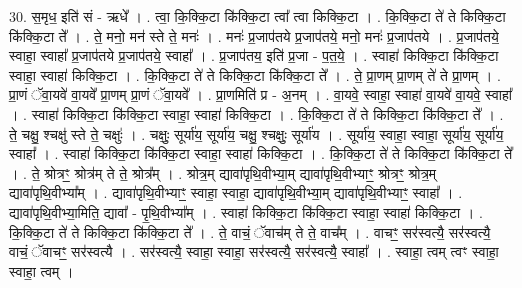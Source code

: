 \documentclass[17pt]{extarticle}
\begin{document}
30. स॒मृध॒ इति॑ सं - ऋधे᳚ । . त्वा॒ कि॒क्कि॒टा कि॑क्कि॒टा त्वा᳚ त्वा किक्कि॒टा । . कि॒क्कि॒टा ते॑ ते किक्कि॒टा कि॑क्कि॒टा ते᳚ । . ते॒ मनो॒ मन॑ स्ते ते॒ मनः॑ । . मनः॑ प्र॒जाप॑तये प्र॒जाप॑तये॒ मनो॒ मनः॑ प्र॒जाप॑तये । . प्र॒जाप॑तये॒ स्वाहा॒ स्वाहा᳚ प्र॒जाप॑तये प्र॒जाप॑तये॒ स्वाहा᳚ । . प्र॒जाप॑तय॒ इति॑ प्र॒जा - प॒त॒ये॒ । . स्वाहा॑ किक्कि॒टा कि॑क्कि॒टा स्वाहा॒ स्वाहा॑ किक्कि॒टा । . कि॒क्कि॒टा ते॑ ते किक्कि॒टा कि॑क्कि॒टा ते᳚ । . ते॒ प्रा॒णम् प्रा॒णम् ते॑ ते प्रा॒णम् । . प्रा॒णं ॅवा॒यवे॑ वा॒यवे᳚ प्रा॒णम् प्रा॒णं ॅवा॒यवे᳚ । . प्रा॒णमिति॑ प्र - अ॒नम् । . वा॒यवे॒ स्वाहा॒ स्वाहा॑ वा॒यवे॑ वा॒यवे॒ स्वाहा᳚ । . स्वाहा॑ किक्कि॒टा कि॑क्कि॒टा स्वाहा॒ स्वाहा॑ किक्कि॒टा । . कि॒क्कि॒टा ते॑ ते किक्कि॒टा कि॑क्कि॒टा ते᳚ । . ते॒ चक्षु॒ श्चक्षु॑ स्ते ते॒ चक्षुः॑ । . चक्षुः॒ सूर्या॑य॒ सूर्या॑य॒ चक्षु॒ श्चक्षुः॒ सूर्या॑य । . सूर्या॑य॒ स्वाहा॒ स्वाहा॒ सूर्या॑य॒ सूर्या॑य॒ स्वाहा᳚ । . स्वाहा॑ किक्कि॒टा कि॑क्कि॒टा स्वाहा॒ स्वाहा॑ किक्कि॒टा । . कि॒क्कि॒टा ते॑ ते किक्कि॒टा कि॑क्कि॒टा ते᳚ । . ते॒ श्रोत्रꣳ॒॒ श्रोत्र॑म् ते ते॒ श्रोत्र᳚म् । . श्रोत्र॒म् द्यावा॑पृथि॒वीभ्या॒म् द्यावा॑पृथि॒वीभ्याꣳ॒॒ श्रोत्रꣳ॒॒ श्रोत्र॒म् द्यावा॑पृथि॒वीभ्या᳚म् । . द्यावा॑पृथि॒वीभ्याꣳ॒॒ स्वाहा॒ स्वाहा॒ द्यावा॑पृथि॒वीभ्या॒म् द्यावा॑पृथि॒वीभ्याꣳ॒॒ स्वाहा᳚ । . द्यावा॑पृथि॒वीभ्या॒मिति॒ द्यावा᳚ - पृ॒थि॒वीभ्या᳚म् । . स्वाहा॑ किक्कि॒टा कि॑क्कि॒टा स्वाहा॒ स्वाहा॑ किक्कि॒टा । . कि॒क्कि॒टा ते॑ ते किक्कि॒टा कि॑क्कि॒टा ते᳚ । . ते॒ वाचं॒ ॅवाच॑म् ते ते॒ वाच᳚म् । . वाचꣳ॒॒ सर॑स्वत्यै॒ सर॑स्वत्यै॒ वाचं॒ ॅवाचꣳ॒॒ सर॑स्वत्यै । . सर॑स्वत्यै॒ स्वाहा॒ स्वाहा॒ सर॑स्वत्यै॒ सर॑स्वत्यै॒ स्वाहा᳚ । . स्वाहा॒ त्वम् त्वꣳ स्वाहा॒ स्वाहा॒ त्वम् । \newline
\end{document}
